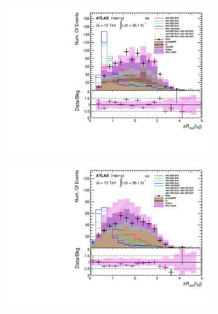 \begin{figure}[h]
\begin{minipage}[t]{0.33\linewidth}
 \centering
 \includegraphics[width=1.0\textwidth,angle=-90]{fig/dataMC_low_Njet_CR/mindR_l1j_ee.pdf}\label{fig:dataMC_low_Njet_CR:mindRl1j_ee.pdf}
 \end{minipage}
 \begin{minipage}[t]{0.33\linewidth}
 \centering
 \includegraphics[width=1.0\textwidth,angle=-90]{fig/dataMC_low_Njet_CR/mindR_l1j_mumu.pdf}\label{fig:dataMC_low_Njet_CR:mindRl1j_mumu.pdf}
 \end{minipage}
 \begin{minipage}[t]{0.33\linewidth}
 \centering

\end{minipage}
\end{figure}
